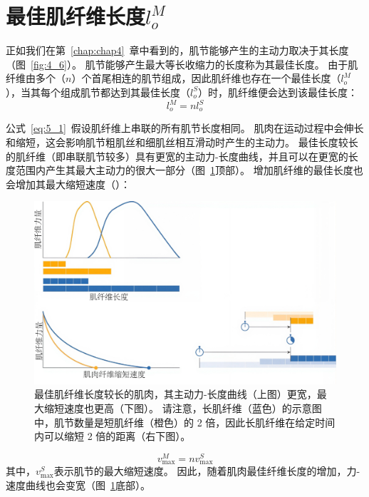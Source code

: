 \section{最佳肌纤维长度$l_o^M$}

正如我们在第~\ref{chap:chap4}~章中看到的，肌节能够产生的主动力取决于其长度（图~\ref{fig:4_6}）。
肌节能够产生最大等长收缩力的长度称为其最佳长度。
由于肌纤维由多个（$n$）个首尾相连的肌节组成，因此肌纤维也存在一个最佳长度（$l_o^M$），当其每个组成肌节都达到其最佳长度（$l_o^S$）时，肌纤维便会达到该最佳长度：
%
\begin{equation}
	l_o^M = n l_o^S \label{eq:5_1}
\end{equation}

公式~\ref{eq:5_1}~假设肌纤维上串联的所有肌节长度相同。
肌肉在运动过程中会伸长和缩短，这会影响肌节粗肌丝和细肌丝相互滑动时产生的主动力。
最佳长度较长的肌纤维（即串联肌节较多）具有更宽的主动力-长度曲线，并且可以在更宽的长度范围内产生其最大主动力的很大一部分（图~\ref{fig:5_2}顶部）。
增加肌纤维的最佳长度也会增加其最大缩短速度（）：

\begin{figure}[!htb]
	\centering
	\includegraphics[width=1.0\linewidth]{chap5/5_2}
	\caption{最佳肌纤维长度较长的肌肉，其主动力-长度曲线（上图）更宽，最大缩短速度也更高（下图）。
		请注意，长肌纤维（蓝色）的示意图中，肌节数量是短肌纤维（橙色）的 2 倍，因此长肌纤维在给定时间内可以缩短 2 倍的距离（右下图）。 \label{fig:5_2}}
\end{figure}

\begin{equation}
	v_{\text{max}}^M = n v_{\text{max}}^S \label{eq:5_2}
\end{equation}
%
其中，$v_\text{max}^S$表示肌节的最大缩短速度。
因此，随着肌肉最佳纤维长度的增加，力-速度曲线也会变宽（图~\ref{fig:5_2}底部）。


